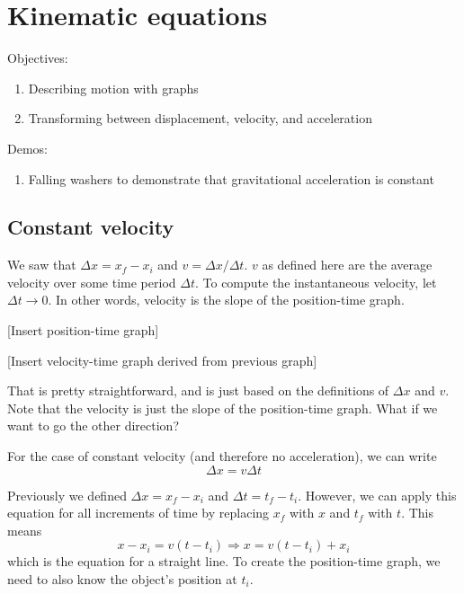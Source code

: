\section{Kinematic equations}
Objectives:
\begin{enumerate}
\item Describing motion with graphs
\item Transforming between displacement, velocity, and acceleration
\end{enumerate}

Demos:
\begin{enumerate}
\item Falling washers to demonstrate that gravitational acceleration is constant
\end{enumerate}


\subsection{Constant velocity}
We saw that $\Delta{x}=x_f-x_i$ and $v=\Delta{x}/\Delta{t}$. $v$ as defined here are the average velocity over some time period $\Delta t$. To compute the instantaneous velocity, let $\Delta t\rightarrow 0$. In other words, velocity is the slope of the position-time graph. %

[Insert position-time graph]
\vspace{5cm}


[Insert velocity-time graph derived from previous graph]\\
\vspace{5cm}

That is pretty straightforward, and is just based on the definitions of $\Delta{x}$ and $v$. Note that the velocity is just the slope of the position-time graph. What if we want to go the other direction?\\
\vspace{5cm}

For the case of constant velocity (and therefore no acceleration), we can write
$$\Delta x = v\Delta t$$

Previously we defined $\Delta x=x_f-x_i$ and $\Delta t = t_f-t_i$. However, we can apply this equation for all increments of time by replacing $x_f$ with $x$ and $t_f$ with $t$. This means
$$x-x_i = v(t-t_i) \Rightarrow x = v(t-t_i) + x_i$$
which is the equation for a straight line. To create the position-time graph, we need to also know the object's position at $t_i$.

